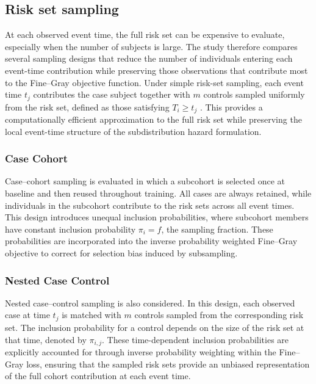 \documentclass[a4paper,twoside,12pt]{report}
\begin{document}
\subsection{Risk set sampling}

At each observed event time, the full risk set can be expensive to evaluate, especially when the number of subjects is large. The study therefore compares several sampling designs that reduce the number of individuals entering each event-time contribution while preserving those observations that contribute most to the Fine–Gray objective function. Under simple risk-set sampling, each event time $t_j$ contributes the case subject together with $m$ controls sampled uniformly from the risk set, defined as those satisfying $T_i \ge t_j$ \cite{Breslow1974}. This provides a computationally efficient approximation to the full risk set while preserving the local event-time structure of the subdistribution hazard formulation.

\subsubsection{Case Cohort}
Case–cohort sampling is evaluated in which a subcohort is selected once at baseline and then reused throughout training. All cases are always retained, while individuals in the subcohort contribute to the risk sets across all event times. This design introduces unequal inclusion probabilities, where subcohort members have constant inclusion probability $\pi_i = f$, the sampling fraction. These probabilities are incorporated into the inverse probability weighted Fine–Gray objective to correct for selection bias induced by subsampling.

\subsubsection{Nested Case Control}
Nested case–control sampling is also considered. In this design, each observed case at time $t_j$ is matched with $m$ controls sampled from the corresponding risk set. The inclusion probability for a control depends on the size of the risk set at that time, denoted by $\pi_{i,j}$. These time-dependent inclusion probabilities are explicitly accounted for through inverse probability weighting within the Fine–Gray loss, ensuring that the sampled risk sets provide an unbiased representation of the full cohort contribution at each event time.

\end{document}
